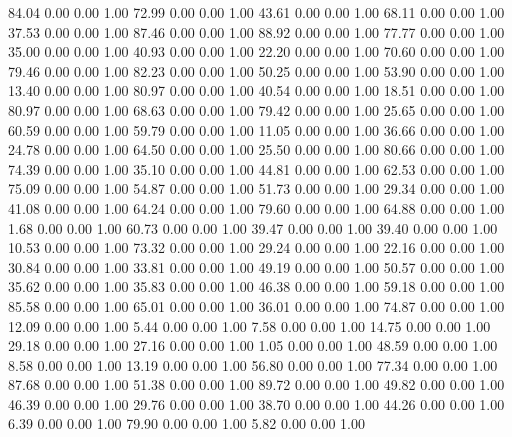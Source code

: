    84.04   0.00   0.00   1.00
   72.99   0.00   0.00   1.00
   43.61   0.00   0.00   1.00
   68.11   0.00   0.00   1.00
   37.53   0.00   0.00   1.00
   87.46   0.00   0.00   1.00
   88.92   0.00   0.00   1.00
   77.77   0.00   0.00   1.00
   35.00   0.00   0.00   1.00
   40.93   0.00   0.00   1.00
   22.20   0.00   0.00   1.00
   70.60   0.00   0.00   1.00
   79.46   0.00   0.00   1.00
   82.23   0.00   0.00   1.00
   50.25   0.00   0.00   1.00
   53.90   0.00   0.00   1.00
   13.40   0.00   0.00   1.00
   80.97   0.00   0.00   1.00
   40.54   0.00   0.00   1.00
   18.51   0.00   0.00   1.00
   80.97   0.00   0.00   1.00
   68.63   0.00   0.00   1.00
   79.42   0.00   0.00   1.00
   25.65   0.00   0.00   1.00
   60.59   0.00   0.00   1.00
   59.79   0.00   0.00   1.00
   11.05   0.00   0.00   1.00
   36.66   0.00   0.00   1.00
   24.78   0.00   0.00   1.00
   64.50   0.00   0.00   1.00
   25.50   0.00   0.00   1.00
   80.66   0.00   0.00   1.00
   74.39   0.00   0.00   1.00
   35.10   0.00   0.00   1.00
   44.81   0.00   0.00   1.00
   62.53   0.00   0.00   1.00
   75.09   0.00   0.00   1.00
   54.87   0.00   0.00   1.00
   51.73   0.00   0.00   1.00
   29.34   0.00   0.00   1.00
   41.08   0.00   0.00   1.00
   64.24   0.00   0.00   1.00
   79.60   0.00   0.00   1.00
   64.88   0.00   0.00   1.00
    1.68   0.00   0.00   1.00
   60.73   0.00   0.00   1.00
   39.47   0.00   0.00   1.00
   39.40   0.00   0.00   1.00
   10.53   0.00   0.00   1.00
   73.32   0.00   0.00   1.00
   29.24   0.00   0.00   1.00
   22.16   0.00   0.00   1.00
   30.84   0.00   0.00   1.00
   33.81   0.00   0.00   1.00
   49.19   0.00   0.00   1.00
   50.57   0.00   0.00   1.00
   35.62   0.00   0.00   1.00
   35.83   0.00   0.00   1.00
   46.38   0.00   0.00   1.00
   59.18   0.00   0.00   1.00
   85.58   0.00   0.00   1.00
   65.01   0.00   0.00   1.00
   36.01   0.00   0.00   1.00
   74.87   0.00   0.00   1.00
   12.09   0.00   0.00   1.00
    5.44   0.00   0.00   1.00
    7.58   0.00   0.00   1.00
   14.75   0.00   0.00   1.00
   29.18   0.00   0.00   1.00
   27.16   0.00   0.00   1.00
    1.05   0.00   0.00   1.00
   48.59   0.00   0.00   1.00
    8.58   0.00   0.00   1.00
   13.19   0.00   0.00   1.00
   56.80   0.00   0.00   1.00
   77.34   0.00   0.00   1.00
   87.68   0.00   0.00   1.00
   51.38   0.00   0.00   1.00
   89.72   0.00   0.00   1.00
   49.82   0.00   0.00   1.00
   46.39   0.00   0.00   1.00
   29.76   0.00   0.00   1.00
   38.70   0.00   0.00   1.00
   44.26   0.00   0.00   1.00
    6.39   0.00   0.00   1.00
   79.90   0.00   0.00   1.00
    5.82   0.00   0.00   1.00
